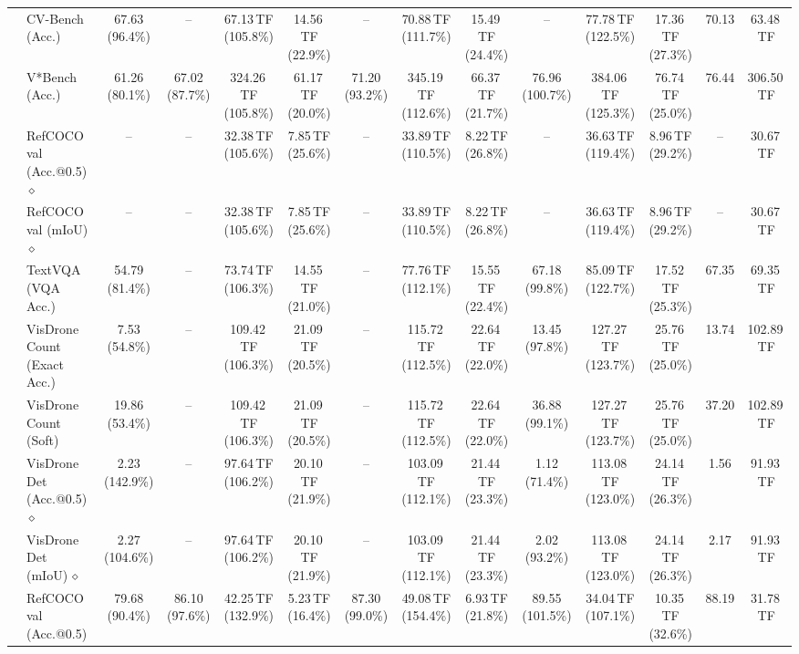 \begin{table}[t]
\begin{center}
\begin{small}
\begin{sc}
{\begin{tabular}{llcccccccccccc}
& CV-Bench (Acc.) & 67.63 (96.4\%) & -- & 67.13\,TF (105.8\%) & 14.56\,TF (22.9\%) & -- & 70.88\,TF (111.7\%) & 15.49\,TF (24.4\%) & -- & 77.78\,TF (122.5\%) & 17.36\,TF (27.3\%) & 70.13 & 63.48\,TF \\
& V*Bench (Acc.) & 61.26 (80.1\%) & 67.02 (87.7\%) & 324.26\,TF (105.8\%) & 61.17\,TF (20.0\%) & 71.20 (93.2\%) & 345.19\,TF (112.6\%) & 66.37\,TF (21.7\%) & 76.96 (100.7\%) & 384.06\,TF (125.3\%) & 76.74\,TF (25.0\%) & 76.44 & 306.50\,TF \\
& RefCOCO val (Acc.@0.5)\,$\diamond$ & -- & -- & 32.38\,TF (105.6\%) & 7.85\,TF (25.6\%) & -- & 33.89\,TF (110.5\%) & 8.22\,TF (26.8\%) & -- & 36.63\,TF (119.4\%) & 8.96\,TF (29.2\%) & -- & 30.67\,TF \\
& RefCOCO val (mIoU)\,$\diamond$ & -- & -- & 32.38\,TF (105.6\%) & 7.85\,TF (25.6\%) & -- & 33.89\,TF (110.5\%) & 8.22\,TF (26.8\%) & -- & 36.63\,TF (119.4\%) & 8.96\,TF (29.2\%) & -- & 30.67\,TF \\
& TextVQA (VQA Acc.) & 54.79 (81.4\%) & -- & 73.74\,TF (106.3\%) & 14.55\,TF (21.0\%) & -- & 77.76\,TF (112.1\%) & 15.55\,TF (22.4\%) & 67.18 (99.8\%) & 85.09\,TF (122.7\%) & 17.52\,TF (25.3\%) & 67.35 & 69.35\,TF \\
& VisDrone Count (Exact Acc.) & 7.53 (54.8\%) & -- & 109.42\,TF (106.3\%) & 21.09\,TF (20.5\%) & -- & 115.72\,TF (112.5\%) & 22.64\,TF (22.0\%) & 13.45 (97.8\%) & 127.27\,TF (123.7\%) & 25.76\,TF (25.0\%) & 13.74 & 102.89\,TF \\
& VisDrone Count (Soft) & 19.86 (53.4\%) & -- & 109.42\,TF (106.3\%) & 21.09\,TF (20.5\%) & -- & 115.72\,TF (112.5\%) & 22.64\,TF (22.0\%) & 36.88 (99.1\%) & 127.27\,TF (123.7\%) & 25.76\,TF (25.0\%) & 37.20 & 102.89\,TF \\
& VisDrone Det (Acc.@0.5)\,$\diamond$ & 2.23 (142.9\%) & -- & 97.64\,TF (106.2\%) & 20.10\,TF (21.9\%) & -- & 103.09\,TF (112.1\%) & 21.44\,TF (23.3\%) & 1.12 (71.4\%) & 113.08\,TF (123.0\%) & 24.14\,TF (26.3\%) & 1.56 & 91.93\,TF \\
& VisDrone Det (mIoU)\,$\diamond$ & 2.27 (104.6\%) & -- & 97.64\,TF (106.2\%) & 20.10\,TF (21.9\%) & -- & 103.09\,TF (112.1\%) & 21.44\,TF (23.3\%) & 2.02 (93.2\%) & 113.08\,TF (123.0\%) & 24.14\,TF (26.3\%) & 2.17 & 91.93\,TF \\
\midrule
{}
& RefCOCO val (Acc.@0.5) & 79.68 (90.4\%) & 86.10 (97.6\%) & 42.25\,TF (132.9\%) & 5.23\,TF (16.4\%) & 87.30 (99.0\%) & 49.08\,TF (154.4\%) & 6.93\,TF (21.8\%) & 89.55 (101.5\%) & 34.04\,TF (107.1\%) & 10.35\,TF (32.6\%) & 88.19 & 31.78\,TF \\

\end{tabular}}
\end{sc}
\end{small}
\end{center}
\end{table}
